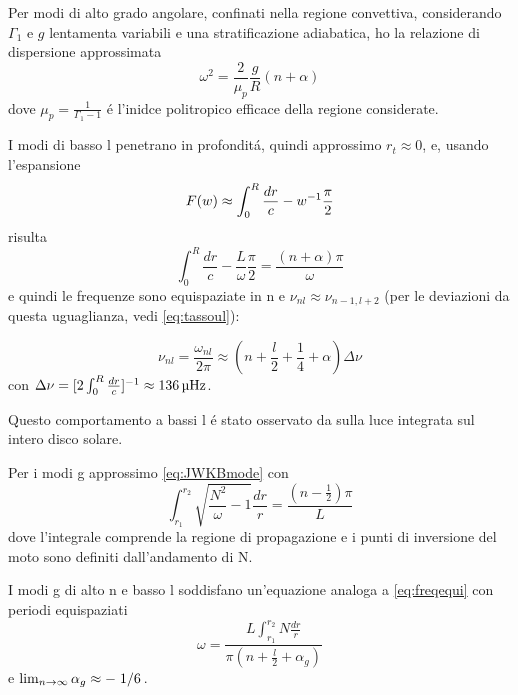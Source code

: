 \documentclass[../main.tex]{subfiles}
\begin{document}
Per modi di alto grado angolare, confinati nella regione convettiva, considerando $\Gamma_1$ e $g$ lentamenta variabili e una stratificazione adiabatica, ho la relazione di dispersione approssimata
\begin{equation}
\omega^2=\frac{2}{\mu_p}\frac{g}{R}(n+\alpha)
\end{equation}
dove $\mu_p=\frac{1}{\Gamma_1-1}$ \'e l'inidce politropico efficace della regione considerate.

I modi di basso l penetrano in profondit\'a, quindi approssimo $r_t\approx0$, e, usando l'espansione
\begin{equation}
F(w)\approx\int_0^R\frac{dr}{c}-w^{-1}\frac{\pi}{2}\label{eq:Flinear}
\end{equation}
 risulta
\begin{equation}
\int_0^R\frac{dr}{c}-\frac{L}{\omega}\frac{\pi}{2}=\frac{(n+\alpha)\pi}{\omega}
\end{equation}
e quindi le  frequenze sono equispaziate in n e $\nu_{nl}\approx\nu_{n-1,l+2}$ (per le deviazioni da questa uguaglianza, vedi \eqref{eq:tassoul}):

\begin{equation}
\nu_{nl}=\frac{\omega_{nl}}{2\pi}\approx(n+\frac{l}{2}+\frac{1}{4}+\alpha)\Delta\nu\label{eq:freqequi}
\end{equation}
con $\Delta\nu=[2\int_0^R\frac{dr}{c}]^{-1}\approx\SI{136}{\micro\hertz}$.

Questo comportamento a bassi l \'e stato osservato da \cite{cla79solar} sulla luce integrata sul intero disco solare.



Per i modi g approssimo \eqref{eq:JWKBmode} con
\begin{equation}
\int_{r_1}^{r_2}\sqrt{\frac{N^2}{\omega}-1}\frac{dr}{r}=\frac{(n-\frac{1}{2})\pi}{L}
\end{equation}
dove l'integrale comprende la regione di propagazione e i punti di inversione del moto sono definiti dall'andamento di N.

I modi g di alto n e basso l soddisfano un'equazione analoga a \eqref{eq:freqequi} con periodi equispaziati
\begin{equation}
\omega=\frac{L\int_{r_1}^{r_2}N\frac{dr}{r}}{\pi(n+\frac{l}{2}+\alpha_g)}
\end{equation}
e $\lim_{n\to\infty}{\alpha_g}\approx-\left.{1}\middle/{6}\right.$.

\end{document}
